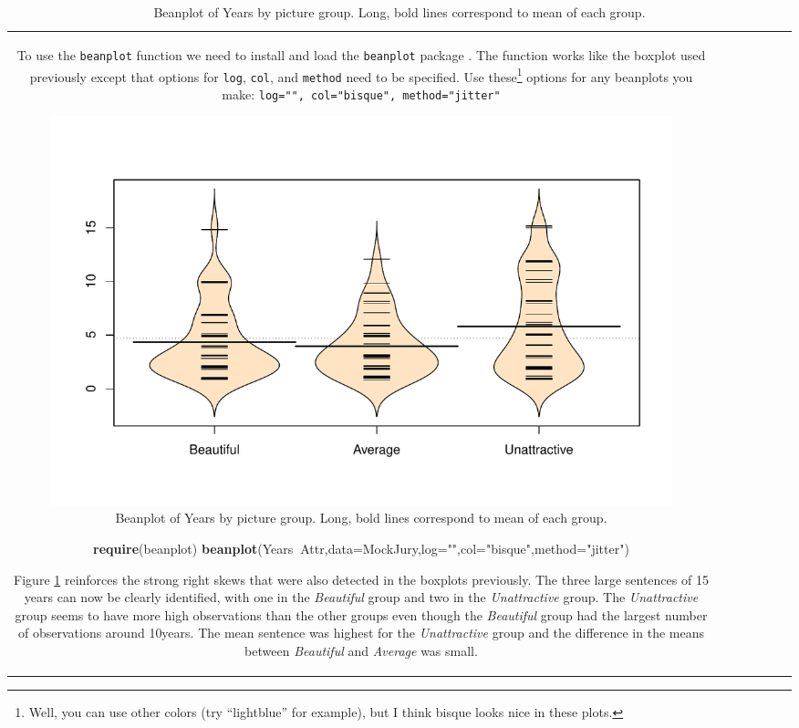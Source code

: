 \documentclass[]{book}
\newenvironment{Shaded}{\begin{snugshade}}{\end{snugshade}}
\newcommand{\KeywordTok}[1]{\textcolor[rgb]{0.13,0.29,0.53}{\textbf{#1}}}
\newcommand{\DataTypeTok}[1]{\textcolor[rgb]{0.13,0.29,0.53}{#1}}
\newcommand{\StringTok}[1]{\textcolor[rgb]{0.31,0.60,0.02}{#1}}
\newcommand{\OperatorTok}[1]{\textcolor[rgb]{0.81,0.36,0.00}{\textbf{#1}}}
\newcommand{\NormalTok}[1]{#1}
\let\rmarkdownfootnote\footnote%
\def\footnote{\protect\rmarkdownfootnote}
\theoremstyle{definition}
\theoremstyle{definition}
\theoremstyle{remark}
\begin{document}
\begin{longtable}[]{@{}ccccccc@{}}
\begin{minipage}[b]{0.10\columnwidth}
To use the \texttt{beanplot} function we need to install and load the
\texttt{beanplot} package \citep{R-beanplot}. The function works like
the boxplot used previously except that options for \texttt{log},
\texttt{col}, and \texttt{method} need to be specified. Use
these\footnote{Well, you can use other colors (try ``lightblue'' for
  example), but I think bisque looks nice in these plots.} options for
any beanplots you make: \texttt{log="",\ col="bisque",\ method="jitter"}




\begin{figure}
\centering
\includegraphics{02-reintroductionToStatistics_files/figure-latex/Figure2-5-1.pdf}
\caption{\label{fig:Figure2-5}Beanplot of Years by picture group. Long, bold lines
correspond to mean of each group.}
\end{figure}

\begin{Shaded}
\begin{Highlighting}[]
\KeywordTok{require}\NormalTok{(beanplot)}
\KeywordTok{beanplot}\NormalTok{(Years}\OperatorTok{~}\NormalTok{Attr,}\DataTypeTok{data=}\NormalTok{MockJury,}\DataTypeTok{log=}\StringTok{""}\NormalTok{,}\DataTypeTok{col=}\StringTok{"bisque"}\NormalTok{,}\DataTypeTok{method=}\StringTok{"jitter"}\NormalTok{)}
\end{Highlighting}
\end{Shaded}

Figure \ref{fig:Figure2-5} reinforces the strong right skews that were
also detected in the boxplots previously. The three large sentences of
15 years can now be clearly identified, with one in the \emph{Beautiful}
group and two in the \emph{Unattractive} group. The \emph{Unattractive}
group seems to have more high observations than the other groups even
though the \emph{Beautiful} group had the largest number of observations
around 10years. The mean sentence was highest for the
\emph{Unattractive} group and the difference in the means between
\emph{Beautiful} and \emph{Average} was small.


\end{minipage}
\end{longtable}
\end{document}
